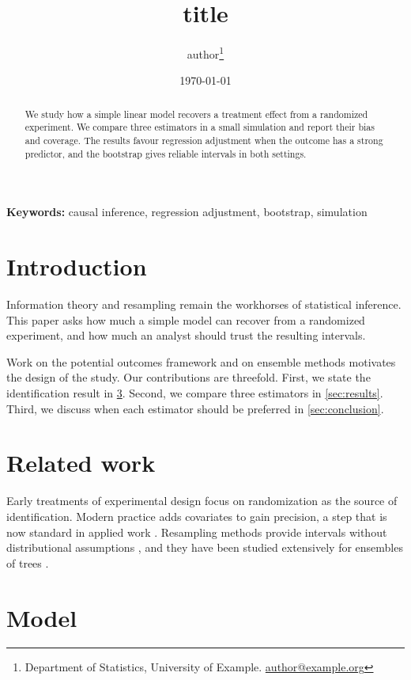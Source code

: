 \documentclass[11pt]{article}
\title{{{title}}}
\author{{{author}}\thanks{Department of Statistics, University of Example. \href{mailto:author@example.org}{author@example.org}}}
\date{\today}
\begin{document}
\maketitle

\begin{abstract}
  We study how a simple linear model recovers a treatment effect from a randomized experiment. We compare three estimators in a small simulation and report their bias and coverage. The results favour regression adjustment when the outcome has a strong predictor, and the bootstrap gives reliable intervals in both settings.
\end{abstract}

\noindent\textbf{Keywords:} causal inference, regression adjustment, bootstrap, simulation

\section{Introduction}\label{sec:introduction}

Information theory \citep{shannon1948} and resampling \citep{efron1979} remain the workhorses of statistical inference. This paper asks how much a simple model can recover from a randomized experiment, and how much an analyst should trust the resulting intervals.

Work on the potential outcomes framework \citet{rubin1974} and on ensemble methods \citep{breiman2001} motivates the design of the study. Our contributions are threefold. First, we state the identification result in \cref{sec:model}. Second, we compare three estimators in \cref{sec:results}. Third, we discuss when each estimator should be preferred in \cref{sec:conclusion}.

\section{Related work}\label{sec:related}

Early treatments of experimental design focus on randomization as the source of identification. Modern practice adds covariates to gain precision, a step that is now standard in applied work \citep{rubin1974}. Resampling methods provide intervals without distributional assumptions \citep{efron1979}, and they have been studied extensively for ensembles of trees \citep{breiman2001}.

\section{Model}\label{sec:model}
\end{document}
